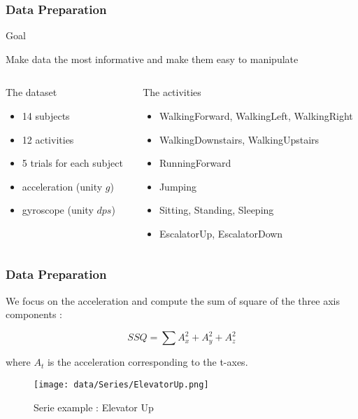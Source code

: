 \documentclass[11pt, sans, handout]{beamer}
\begin{document}
\begin{frame}
	\frametitle{Data Preparation} 
	
	 \begin{alertblock}{Goal}

		Make data the most informative and make them easy to manipulate

	\end{alertblock}
	
	\begin{columns}
	
	\begin{column}{0.5\textwidth}
		\begin{block}{The dataset}

		\begin{itemize}
			\item 14 subjects
			\item 12 activities
			\item 5 trials for each subject
			\item acceleration (unity $g$)
			\item gyroscope (unity $dps$)
		\end{itemize}

		\end{block}
	\end{column}
	
	\begin{column}{0.5\textwidth}
		\begin{block}{The activities}
		
		\begin{itemize}
			\item WalkingForward, WalkingLeft, WalkingRight
			\item WalkingDownstairs, WalkingUpstairs
			\item RunningForward
			\item Jumping
			\item Sitting, Standing, Sleeping
			\item EscalatorUp, EscalatorDown
		\end{itemize}
		
		\end{block}
	\end{column}
	
	\end{columns}
	
\end{frame}

\begin{frame}
\frametitle{Data Preparation}

	We focus on the acceleration and compute the sum of square of the three axis components :
	
	\[ SSQ = \sum A_x^2 + A_y^2 + A_z^2 \]
	
	where $A_t$ is the acceleration corresponding to the t-axes.
	
	\begin{figure}[H]
		\centering
		\texttt{[image: data/Series/ElevatorUp.png]}
		\caption{Serie example : Elevator Up}
		\label{ElevatorUp}
	\end{figure}
	
\end{frame}
\end{document}
